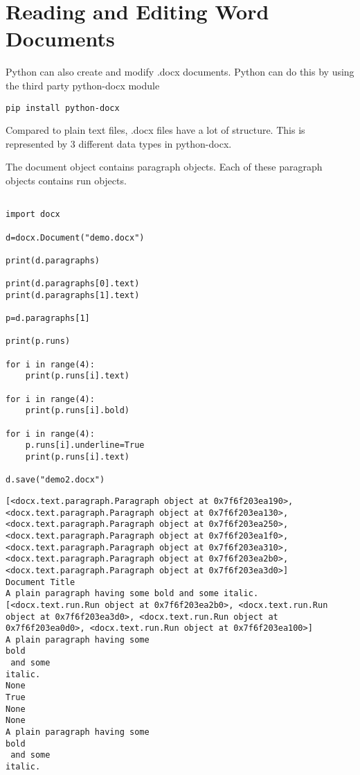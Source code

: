 \documentclass[11pt]{article}
\begin{document}
\section{Reading and Editing Word Documents}
\label{sec:org8643190}

Python can also create and modify .docx documents. Python can do this by using the third party python-docx module

\begin{verbatim}
pip install python-docx
\end{verbatim}

Compared to plain text files, .docx files have a lot of structure. This is represented by 3 different data types in python-docx.

The document object contains paragraph objects. Each of these paragraph objects contains run objects.

\begin{verbatim}

import docx

d=docx.Document("demo.docx")

print(d.paragraphs)

print(d.paragraphs[0].text)
print(d.paragraphs[1].text)

p=d.paragraphs[1]

print(p.runs)

for i in range(4):
    print(p.runs[i].text)

for i in range(4):
    print(p.runs[i].bold)

for i in range(4):
    p.runs[i].underline=True
    print(p.runs[i].text)

d.save("demo2.docx")

\end{verbatim}

\begin{verbatim}
[<docx.text.paragraph.Paragraph object at 0x7f6f203ea190>, <docx.text.paragraph.Paragraph object at 0x7f6f203ea130>, <docx.text.paragraph.Paragraph object at 0x7f6f203ea250>, <docx.text.paragraph.Paragraph object at 0x7f6f203ea1f0>, <docx.text.paragraph.Paragraph object at 0x7f6f203ea310>, <docx.text.paragraph.Paragraph object at 0x7f6f203ea2b0>, <docx.text.paragraph.Paragraph object at 0x7f6f203ea3d0>]
Document Title
A plain paragraph having some bold and some italic.
[<docx.text.run.Run object at 0x7f6f203ea2b0>, <docx.text.run.Run object at 0x7f6f203ea3d0>, <docx.text.run.Run object at 0x7f6f203ea0d0>, <docx.text.run.Run object at 0x7f6f203ea100>]
A plain paragraph having some 
bold
 and some 
italic.
None
True
None
None
A plain paragraph having some 
bold
 and some 
italic.
\end{verbatim}
\end{document}
